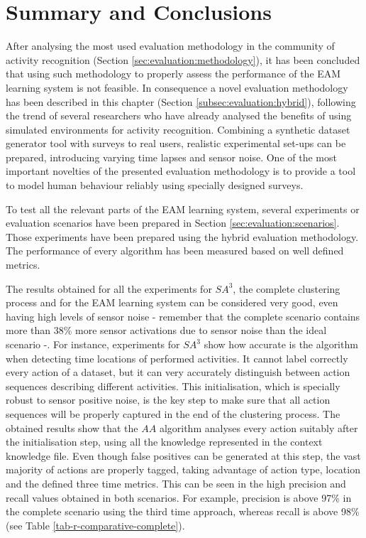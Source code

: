 \section{Summary and Conclusions}
\label{sec:evaluation:conclusions}

After analysing the most used evaluation methodology in the community of activity recognition (Section \ref{sec:evaluation:methodology}), it has been concluded that using such methodology to properly assess the performance of the EAM learning system is not feasible. In consequence a novel evaluation methodology has been described in this chapter (Section \ref{subsec:evaluation:hybrid}), following the trend of several researchers who have already analysed the benefits of using simulated environments for activity recognition. Combining a synthetic dataset generator tool with surveys to real users, realistic experimental set-ups can be prepared, introducing varying time lapses and sensor noise. One of the most important novelties of the presented evaluation methodology is to provide a tool to model human behaviour reliably using specially designed surveys. 

To test all the relevant parts of the EAM learning system, several experiments or evaluation scenarios have been prepared in Section \ref{sec:evaluation:scenarios}. Those experiments have been prepared using the hybrid evaluation methodology. The performance of every algorithm has been measured based on well defined metrics.

The results obtained for all the experiments for $SA^3$, the complete clustering process and for the EAM learning system can be considered very good, even having high levels of sensor noise - remember that the complete scenario contains more than 38\% more sensor activations due to sensor noise than the ideal scenario -. For instance, experiments for $SA^3$ show how accurate is the algorithm when detecting time locations of performed activities. It cannot label correctly every action of a dataset, but it can very accurately distinguish between action sequences describing different activities. This initialisation, which is specially robust to sensor positive noise, is the key step to make sure that all action sequences will be properly captured in the end of the clustering process. The obtained results show that the $AA$ algorithm analyses every action suitably after the initialisation step, using all the knowledge represented in the context knowledge file. Even though false positives can be generated at this step, the vast majority of actions are properly tagged, taking advantage of action type, location and the defined three time metrics. This can be seen in the high precision and recall values obtained in both scenarios. For example, precision is above 97\% in the complete scenario using the third time approach, whereas recall is above 98\% (see Table \ref{tab-r-comparative-complete}). 

